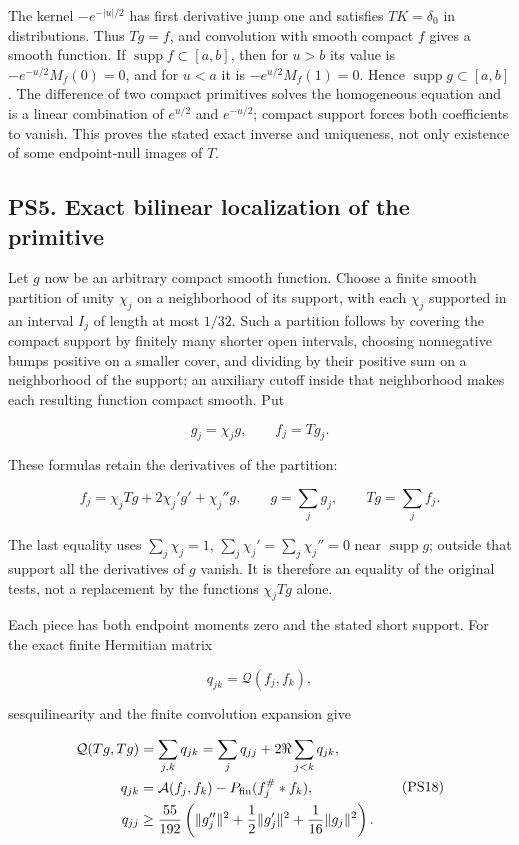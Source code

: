 \documentclass[
  10pt,
  a4paper,
]{article}
\begin{document}
The kernel \(-e^{-|u|/2}\) has first derivative jump one and satisfies
\(TK=\delta_0\) in distributions. Thus \(Tg=f\), and convolution with
smooth compact \(f\) gives a smooth function. If
\(\operatorname{supp}f\subset[a,b]\), then for \(u>b\) its value is
\(-e^{-u/2}M_f(0)=0\), and for \(u<a\) it is \(-e^{u/2}M_f(1)=0\). Hence
\(\operatorname{supp}g\subset[a,b]\). The difference of two compact
primitives solves the homogeneous equation and is a linear combination
of \(e^{u/2}\) and \(e^{-u/2}\); compact support forces both
coefficients to vanish. This proves the stated exact inverse and
uniqueness, not only existence of some endpoint-null images of \(T\).

\subsection{PS5. Exact bilinear localization of the
primitive}\label{ps5.-exact-bilinear-localization-of-the-primitive}

Let \(g\) now be an arbitrary compact smooth function. Choose a finite
smooth partition of unity \(\chi_j\) on a neighborhood of its support,
with each \(\chi_j\) supported in an interval \(I_j\) of length at most
\(1/32\). Such a partition follows by covering the compact support by
finitely many shorter open intervals, choosing nonnegative bumps
positive on a smaller cover, and dividing by their positive sum on a
neighborhood of the support; an auxiliary cutoff inside that
neighborhood makes each resulting function compact smooth. Put

\[
g_j=\chi_jg,\qquad f_j=Tg_j.
\tag{PS16}
\]

These formulas retain the derivatives of the partition:

\[
f_j=\chi_jTg+2\chi_j'g'+\chi_j''g,
\qquad g=\sum_jg_j,\qquad Tg=\sum_jf_j.
\tag{PS17}
\]

The last equality uses \(\sum_j\chi_j=1\),
\(\sum_j\chi_j'=\sum_j\chi_j''=0\) near \(\operatorname{supp}g\);
outside that support all the derivatives of \(g\) vanish. It is
therefore an equality of the original tests, not a replacement by the
functions \(\chi_jTg\) alone.

Each piece has both endpoint moments zero and the stated short support.
For the exact finite Hermitian matrix

\[
q_{jk}=\mathcal Q(f_j,f_k),
\]

sesquilinearity and the finite convolution expansion give

\[
\begin{aligned}
\mathcal Q(Tg,Tg)
&=\sum_{j,k}q_{jk}
=\sum_j q_{jj}+2\Re\sum_{j<k}q_{jk},\\
q_{jk}
&=\mathcal A(f_j,f_k)-P_{\rm fin}(f_j^\#*f_k),\\
q_{jj}
&\ge\frac{55}{192}
\left(\|g_j''\|^2+\frac12\|g_j'\|^2
+\frac1{16}\|g_j\|^2\right).
\end{aligned}
\tag{PS18}
\]
\end{document}

